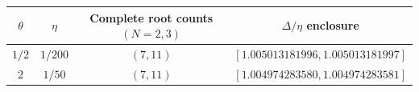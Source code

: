\begin{tabular}{@{}cccc@{}}
\toprule
$\theta$ & $\eta$ & Complete root counts $(N=2,3)$ & $\Delta/\eta$ enclosure\\
\midrule
$1/2$ & $1/200$ & $(7,11)$ & $[1.005013181996, 1.005013181997]$\\
$2$ & $1/50$ & $(7,11)$ & $[1.004974283580, 1.004974283581]$\\
\bottomrule
\end{tabular}
